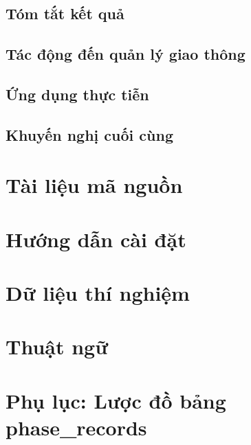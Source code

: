\documentclass[12pt,a4paper,oneside]{report}
\begin{document}
\section{Tóm tắt kết quả}
\section{Tác động đến quản lý giao thông}
\section{Ứng dụng thực tiễn}
\section{Khuyến nghị cuối cùng}

\cleardoublepage
{}
{}
\printbibliography[title={Tài liệu tham khảo}]

\appendix

\chapter{Tài liệu mã nguồn}
% 

\chapter{Hướng dẫn cài đặt}

\chapter{Dữ liệu thí nghiệm}

\chapter{Thuật ngữ}

\chapter{Phụ lục: Lược đồ bảng phase\_records}

\end{document}
